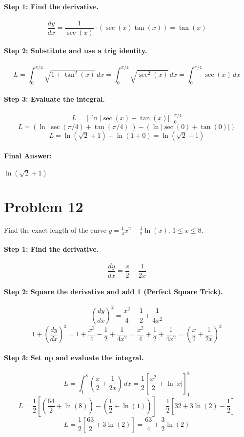 \documentclass{article}
\begin{document}
\paragraph{Step 1: Find the derivative.}
\[ \frac{dy}{dx} = \frac{1}{\sec(x)} \cdot (\sec(x)\tan(x)) = \tan(x) \]

\paragraph{Step 2: Substitute and use a trig identity.}
\[ L = \int_{0}^{\pi/4} \sqrt{1 + \tan^2(x)} \,dx = \int_{0}^{\pi/4} \sqrt{\sec^2(x)} \,dx = \int_{0}^{\pi/4} \sec(x) \,dx \]

\paragraph{Step 3: Evaluate the integral.}
\[ L = [\ln|\sec(x) + \tan(x)|]_{0}^{\pi/4} \]
\[ L = (\ln|\sec(\pi/4) + \tan(\pi/4)|) - (\ln|\sec(0) + \tan(0)|) \]
\[ L = \ln(\sqrt{2} + 1) - \ln(1 + 0) = \ln(\sqrt{2} + 1) \]

\paragraph{Final Answer:} $\ln(\sqrt{2} + 1)$

\section*{Problem 12}
Find the exact length of the curve $y = \frac{1}{4}x^2 - \frac{1}{2}\ln(x)$, $1 \le x \le 8$.

\paragraph{Step 1: Find the derivative.}
\[ \frac{dy}{dx} = \frac{x}{2} - \frac{1}{2x} \]

\paragraph{Step 2: Square the derivative and add 1 (Perfect Square Trick).}
\[ (\frac{dy}{dx})^2 = \frac{x^2}{4} - \frac{1}{2} + \frac{1}{4x^2} \]
\[ 1 + (\frac{dy}{dx})^2 = 1 + \frac{x^2}{4} - \frac{1}{2} + \frac{1}{4x^2} = \frac{x^2}{4} + \frac{1}{2} + \frac{1}{4x^2} = (\frac{x}{2} + \frac{1}{2x})^2 \]

\paragraph{Step 3: Set up and evaluate the integral.}
\[ L = \int_{1}^{8} (\frac{x}{2} + \frac{1}{2x}) \,dx = \frac{1}{2} [\frac{x^2}{2} + \ln|x|]_{1}^{8} \]
\[ L = \frac{1}{2} [ (\frac{64}{2} + \ln(8)) - (\frac{1}{2} + \ln(1)) ] = \frac{1}{2} [ 32 + 3\ln(2) - \frac{1}{2} ] \]
\[ L = \frac{1}{2} [ \frac{63}{2} + 3\ln(2) ] = \frac{63}{4} + \frac{3}{2}\ln(2) \]
\end{document}
